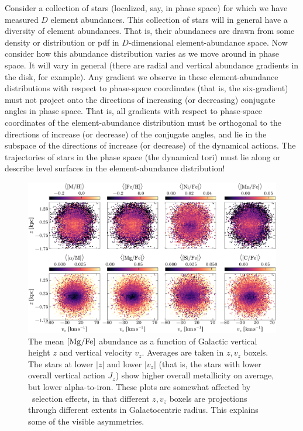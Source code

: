 \documentclass[modern]{aastex63}
\newcommand{\apogee}{\acronym{APOGEE}}
\begin{document}
Consider a collection of stars (localized, say, in phase space) for which we have
measured $D$ element abundances.
This collection of stars will in general have a diversity of element abundances.
That is, their abundances are drawn from some density or distribution or pdf in
$D$-dimensional element-abundance space.
Now consider how this abundance distribution varies as we move around in phase space.
It will vary in general (there are radial and vertical abundance gradients in the
disk, for example).
Any gradient we observe in these element-abundance distributions with respect to
phase-space coordinates (that is, the six-gradient) must not project
onto the directions of increasing (or decreasing) conjugate angles in phase space.
That is, all gradients with respect to phase-space coordinates
of the element-abundance distribution must be orthogonal to the
directions of increase (or decrease) of the conjugate angles, and lie in the subspace
of the directions of increase (or decrease) of the dynamical actions.
The trajectories of stars in the phase space (the dynamical tori) must lie along or
describe level surfaces in the element-abundance distribution!

\begin{figure}[!tp]
  \begin{center}
  \includegraphics[width=\textwidth]{abundance-zvz-grid.pdf}
  \end{center}
  \caption{%
    The mean ${[\mathrm{Mg}/\mathrm{Fe}]}$ abundance as a function of
    Galactic vertical height $z$ and vertical velocity $v_z$.
    Averages are taken in $z, v_z$ boxels.
    The stars at lower $|z|$ and lower $|v_z|$ (that is, the stars with
    lower overall vertical action $J_z$) show higher overall metallicity
    on average, but lower alpha-to-iron.
    These plots are somewhat affected by \apogee\ selection effects, in
    that different $z, v_z$ boxels are projections through different extents
    in Galactocentric radius. This explains some of the visible asymmetries.
  \label{fig:zvz-grid}
  }
\end{figure}
\end{document}
